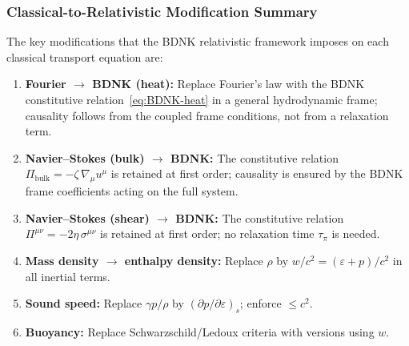 \subsubsection{Classical-to-Relativistic Modification Summary}
The key modifications that the BDNK relativistic framework imposes on
each classical transport equation are:
\begin{enumerate}
  \item \textbf{Fourier $\to$ BDNK (heat):}
    Replace Fourier's law with the BDNK constitutive
    relation~\eqref{eq:BDNK-heat} in a general hydrodynamic frame;
    causality follows from the coupled frame conditions, not from a
    relaxation term.
  \item \textbf{Navier--Stokes (bulk) $\to$ BDNK:}
    The constitutive relation $\Pi_{\text{bulk}} = -\zeta\,\nabla_{\mu}u^{\mu}$
    is retained at first order; causality is ensured by the BDNK frame
    coefficients acting on the full system.
  \item \textbf{Navier--Stokes (shear) $\to$ BDNK:}
    The constitutive relation $\Pi^{\mu\nu} = -2\eta\,\sigma^{\mu\nu}$
    is retained at first order; no relaxation time $\tau_{\pi}$ is needed.
  \item \textbf{Mass density $\to$ enthalpy density:}
    Replace $\rho$ by $w/c^{2} = (\varepsilon+p)/c^{2}$ in all inertial
    terms.
  \item \textbf{Sound speed:}
    Replace $\gamma p/\rho$ by $(\partial p/\partial\varepsilon)_{s}$;
    enforce $\le c^{2}$.
  \item \textbf{Buoyancy:}
    Replace Schwarzschild/Ledoux criteria with versions using $w$.
\end{enumerate}


